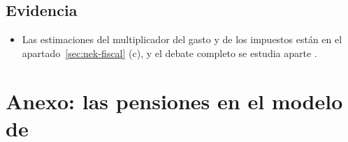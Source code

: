 \documentclass[11pt]{article}
\begin{document}
\subsection{Evidencia}

\begin{itemize}
\item Las estimaciones del multiplicador del gasto y de los impuestos están en el apartado~\ref{sec:nek-fiscal} (c), y el debate completo se estudia aparte .
\end{itemize}

\section{Anexo: las pensiones en el modelo de }\label{anexo:pensiones}
\end{document}
